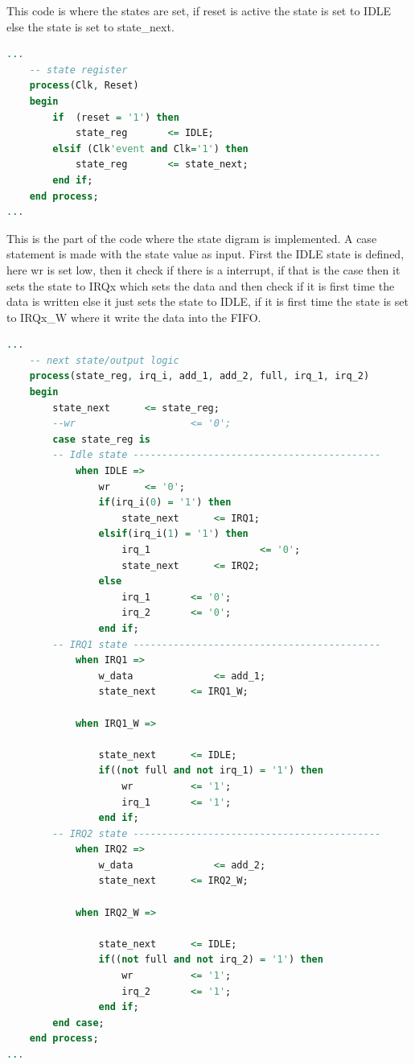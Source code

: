 This code is where the states are set, if reset is active the state is set to IDLE else the state is set to state\_next.
\begin{lstlisting}[language=VHDL]
...
	-- state register
	process(Clk, Reset)
	begin
		if	(reset = '1') then
			state_reg		<= IDLE;
		elsif (Clk'event and Clk='1') then
			state_reg		<= state_next;
		end if;
	end process;
...
\end{lstlisting}
This is the part of the code where the state digram is implemented. A case statement is made with the state value as input. First the IDLE state is defined, here wr is set low, then it check if there is a interrupt, if that is the case then it sets the state to IRQx which sets the data and then check if it is first time the data is written else it just sets the state to IDLE, if it is first time the state is set to IRQx\_W where it write the data into the FIFO.
\begin{lstlisting}[language=VHDL]
...
	-- next state/output logic
	process(state_reg, irq_i, add_1, add_2, full, irq_1, irq_2)
	begin
		state_next		<= state_reg;
		--wr					<= '0';
		case state_reg is
		-- Idle state -------------------------------------------
			when IDLE =>
				wr		<= '0';
				if(irq_i(0) = '1') then
					state_next		<= IRQ1;
				elsif(irq_i(1) = '1') then
					irq_1					<= '0';
					state_next		<= IRQ2;
				else
					irq_1		<= '0';
					irq_2		<= '0';
				end if;
		-- IRQ1 state -------------------------------------------
			when IRQ1 =>
				w_data				<= add_1;
				state_next		<= IRQ1_W;

			when IRQ1_W =>

				state_next		<= IDLE;
				if((not full and not irq_1) = '1') then
					wr			<= '1';
					irq_1		<= '1';
				end if;
		-- IRQ2 state -------------------------------------------
			when IRQ2 =>
				w_data				<= add_2;
				state_next		<= IRQ2_W;

			when IRQ2_W =>

				state_next		<= IDLE;
				if((not full and not irq_2) = '1') then
					wr			<= '1';
					irq_2		<= '1';
				end if;
		end case;
	end process;
...
\end{lstlisting}

